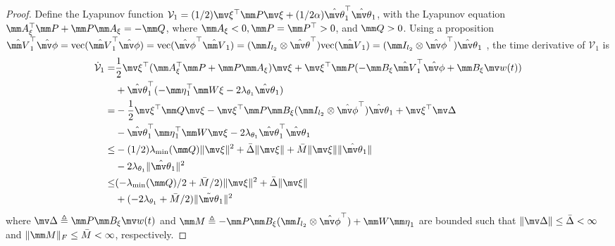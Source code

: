 \documentclass[letterpaper, 10 pt, conference]{ieeeconf}  %
\begin{document}
\begin{proof}
Define the Lyapunov function $\mathcal V_1=(1/2)\mv\xi^\top \mm P\mv\xi+(1/2\alpha){\hat{\mv\theta}}_1^\top {\hat{\mv\theta}}_1$, with the Lyapunov equation $\mm A_\xi^\top \mm P+\mm P\mm A_\xi=-\mm Q$, where $\mm A_\xi<0,\mm P=\mm P^\top >0$, and $\mm Q>0$.
Using a proposition $\hat {\mm V}_1^\top \hat{\mv\phi} = \text{vec}(\hat {\mm V}_1^\top \hat{\mv\phi})=\text{vec}(\hat{\mv\phi}^\top \hat {\mm V}_1) = (\mm I_{l_2}\otimes {\hat{\mv\theta}}^\top )\text{vec}(\hat {\mm V}_1)=(\mm I_{l_2}\otimes \hat{\mv\phi}^\top ){\hat{\mv\theta}}_1$ \cite[Proposition~(7.1.9)]{RN22}, the time derivative of $\mathcal V_1$ is
\begin{equation}
    \begin{aligned}
        \dot {\mathcal V}_1 
        =& 
        {1\over 2}
        \mv \xi^\top (\mm A_\xi^\top \mm P+\mm P\mm A_\xi)\mv \xi
        +
        \mv \xi^\top \mm P ( -\mm B_\xi\hat {\mm V}_1^\top \hat {\mv \phi} +\mm B_\xi \mv w(t) )\\
        &
        +{\hat{\mv\theta}}_1^\top 
        (
            -{\mm \eta}_1^\top \mm W \xi-2\lambda_{\theta_1} {\hat{\mv\theta}}_1 
        )
        \\
        =& 
        -{1\over 2}\mv \xi^\top \mm Q\mv \xi 
        -
        \mv \xi^\top \mm P\mm B_\xi(\mm I_{l_2}\otimes \hat{\mv\phi}^\top ){\hat{\mv\theta}}_1 
        +\mv \xi^\top \mv \Delta
        \\
        &
        -{\hat{\mv\theta}}_1^\top {\mm \eta}_1^\top \mm W\mv \xi
        -2\lambda_{\theta_1} {\hat{\mv\theta}}_1^\top {\hat{\mv\theta}}_1
        \\
        \le&
        -(1/2)\lambda_\text{min}(\mm Q)\Vert \mv \xi\Vert ^2
        +\bar\Delta \Vert \mv \xi\Vert  
        +\bar M\Vert \mv \xi\Vert  \Vert {\hat{\mv\theta}}_1\Vert
        \\
        &
        -2\lambda_{\theta_1}
        \Vert{\hat{\mv\theta}}_1\Vert ^2
        \\
        \le& 
        (
        -{\lambda_\text{min}(\mm Q)/ 2} +{\bar M/ 2}
        )
        \Vert \mv \xi\Vert ^2 +\bar\Delta \Vert \mv \xi\Vert  
        \\
        &+ 
        (
        -2\lambda_{\theta_1} 
        +\bar M/ 2
        )
        \Vert \tilde{\mv \theta}_1\Vert ^2 
        \end{aligned}
        \label{eq. lya 1}
\end{equation}
where $\mv \Delta\triangleq \mm P\mm B_\xi \mv w(t)$ and $\mm M\triangleq -\mm P\mm B_\xi(\mm I_{l_2}\otimes \hat{\mv\phi}^\top )+\mm W{\mm \eta}_1$ are bounded such that $\Vert\mv \Delta\Vert\le\bar\Delta<\infty$ and $\Vert\mm M\Vert_F\le \bar M< \infty$, respectively.


\end{proof}
\end{document}
